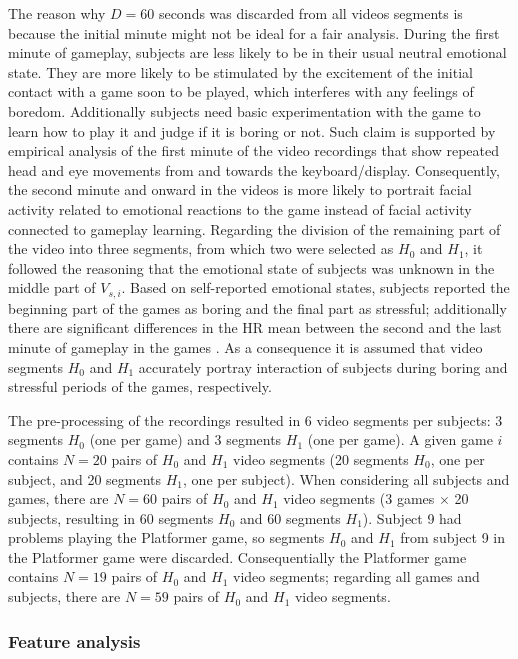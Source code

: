 The reason why $D=60$ seconds was discarded from all videos segments is because the initial minute might not be ideal for a fair analysis. During the first minute of gameplay, subjects are less likely to be in their usual neutral emotional state. They are more likely to be stimulated by the excitement of the initial contact with a game soon to be played, which interferes with any feelings of boredom. Additionally subjects need basic experimentation with the game to learn how to play it and judge if it is boring or not. Such claim is supported by empirical analysis of the first minute of the video recordings that show repeated head and eye movements from and towards the keyboard/display. Consequently, the second minute and onward in the videos is more likely to portrait facial activity related to emotional reactions to the game instead of facial activity connected to gameplay learning. Regarding the division of the remaining part of the video into three segments, from which two were selected as $H_0$ and $H_1$, it followed the reasoning that the emotional state of subjects was unknown in the middle part of $V_{s,i}$. Based on self-reported emotional states, subjects reported the beginning part of the games as boring and the final part as stressful; additionally there are significant differences in the HR mean between the second and the last minute of gameplay in the games \parencite{bevilacqua2018changes}. As a consequence it is assumed that video segments $H_0$ and $H_1$ accurately portray interaction of subjects during boring and stressful periods of the games, respectively.

The pre-processing of the recordings resulted in 6 video segments per subjects: 3 segments $H_0$ (one per game) and 3 segments $H_1$ (one per game). A given game $i$ contains $N=20$ pairs of $H_0$ and $H_1$ video segments (20 segments $H_0$, one per subject, and 20 segments $H_1$, one per subject). When considering all subjects and games, there are $N=60$ pairs of $H_0$ and $H_1$ video segments (3 games $\times$ 20 subjects, resulting in 60 segments $H_0$ and 60 segments $H_1$). Subject 9 had problems playing the Platformer game, so segments $H_0$ and $H_1$ from subject 9 in the Platformer game were discarded. Consequentially the Platformer game contains $N=19$ pairs of $H_0$ and $H_1$ video segments; regarding all games and subjects, there are $N=59$ pairs of $H_0$ and $H_1$ video segments.

\subsubsection{Feature analysis}

